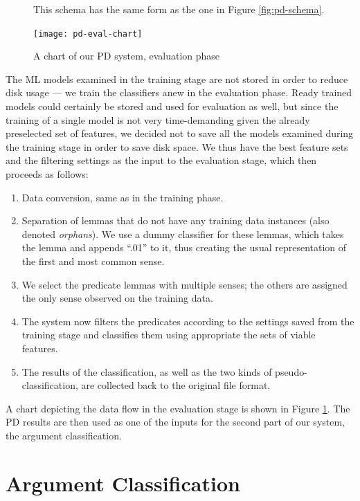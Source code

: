 \documentclass[12pt,notitlepage,a4paper]{report}
\begin{document}
\begin{figure}[htb]
\caption{A chart of our PD system, evaluation phase}\label{fig:pd-eval}
\noindent\footnotesize This schema has the same form as the one in Figure \ref{fig:pd-schema}.
\begin{center}
\texttt{[image: pd-eval-chart]}
\end{center}
\end{figure}

The ML models examined in the training stage are not stored in order to reduce disk usage --- we train the classifiers anew in the evaluation phase. Ready trained models could certainly be stored and used for evaluation as well, but since the training of a single model is not very time-demanding given the already preselected set of features, we decided not to save all the models examined during the training stage in order to save disk space. We thus have the best feature sets and the filtering settings as the input to the evaluation stage, which then proceeds as follows:
\begin{enumerate}
    \item Data conversion, same as in the training phase.
    \item Separation of lemmas that do not have any training data instances (also denoted \emph{orphans}). We use a dummy classifier for these lemmas, which takes the lemma and appends ``.01'' to it, thus creating the usual representation of the first and most common sense.
    \item We select the predicate lemmas with multiple senses; the others are assigned the only sense observed on the training data.
    \item The system now filters the predicates according to the settings saved from the training stage and classifies them using appropriate the sets of viable features.
    \item The results of the classification, as well as the two kinds of pseudo-classification, are collected back to the original file format.
\end{enumerate}
A chart depicting the data flow in the evaluation stage is shown in Figure \ref{fig:pd-eval}. The PD results are then used as one of the inputs for the second part of our system, the argument classification.

%
%
\chapter{Argument Classification}\label{ac}
%
%
\end{document}
